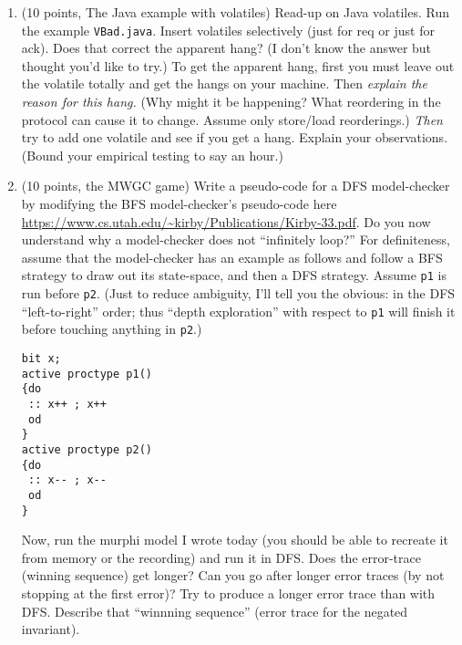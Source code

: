 \documentclass[11pt]{article}
\begin{document}
\begin{enumerate}
\item (10 points, The Java example with volatiles)
  Read-up on Java volatiles. Run the example \verb|VBad.java|.
  Insert volatiles selectively (just for req or just for ack).
  Does that correct the apparent hang? (I don't know the answer
  but thought you'd like to try.) To get the apparent hang,
  first you must leave out the volatile totally and get the
  hangs on your machine.
  Then {\em explain the reason for this hang.} (Why might it be
  happening? What reordering in the protocol can cause it to
  change. Assume only store/load reorderings.\footnotemark)
  {\em Then} try to add one volatile
  and see if you get a hang. Explain your observations. (Bound
  your empirical testing to say an hour.)

  \begin{minipage}{\minpagw}
  \end{minipage}


\item (10 points, the MWGC game)
  Write a pseudo-code for a DFS model-checker by modifying the BFS model-checker's
  pseudo-code here
  \url{https://www.cs.utah.edu/~kirby/Publications/Kirby-33.pdf}.
  Do you now understand why a model-checker does not ``infinitely loop?''
  For definiteness, assume that the model-checker has an example as follows
  and follow a BFS strategy to draw out its state-space, and then a DFS
  strategy.
  Assume {\tt p1} is run before {\tt p2}. (Just to
  reduce ambiguity, I'll tell you
  the obvious: in the DFS ``left-to-right'' order;
  thus ``depth exploration'' with respect to {\tt p1} will finish it before
  touching anything in {\tt p2}.)
  \begin{footnotesize}
  \begin{verbatim}    
bit x;
active proctype p1()
{do
 :: x++ ; x++ 
 od
}
active proctype p2()
{do
 :: x-- ; x-- 
 od
}
\end{verbatim}
  \end{footnotesize}    
  Now, run the murphi model I wrote today (you should be able to recreate it from
  memory or the recording) and run it in DFS.
  Does the error-trace (winning sequence) get longer?
  Can you go after longer error traces (by not stopping at the first error)?
  Try to produce a longer error trace than with DFS.
  Describe that ``winnning sequence'' (error trace for the negated invariant).


\end{enumerate}
\end{document}
